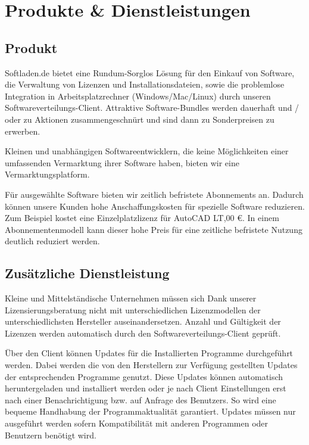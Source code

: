 \chapter{Produkte \& Dienstleistungen}
\section{Produkt}
Softladen.de bietet eine Rundum-Sorglos Lösung für den Einkauf von Software, die Verwaltung von Lizenzen und Installationsdateien, sowie die problemlose Integration in Arbeitsplatzrechner (Windows/Mac/Linux) durch unseren Softwareverteilungs-Client. Attraktive Software-Bundles werden dauerhaft und / oder zu Aktionen zusammengeschnürt und sind dann zu Sonderpreisen zu erwerben.\\ \medskip 

Kleinen und unabhängigen Softwareentwicklern, die keine Möglichkeiten einer umfassenden Vermarktung ihrer Software haben, bieten wir eine Vermarktungsplatform.\\ \medskip

Für ausgewählte Software bieten wir zeitlich befristete Abonnements an. Dadurch können unsere Kunden hohe Anschaffungskosten für spezielle Software reduzieren. Zum Beispiel kostet eine Einzelplatzlizenz für AutoCAD LT,00 €. In einem Abonnementenmodell kann dieser hohe Preis für eine zeitliche befristete Nutzung deutlich reduziert werden.  \\ \medskip

\section{Zusätzliche Dienstleistung}
Kleine und Mittelständische Unternehmen müssen sich Dank unserer Lizensierungsberatung nicht mit unterschiedlichen Lizenzmodellen der unterschiedlichsten Hersteller auseinandersetzen. Anzahl und Gültigkeit der Lizenzen werden automatisch durch den Softwareverteilungs-Client geprüft.\\ \medskip

Über den Client können Updates für die Installierten Programme durchgeführt werden. Dabei werden die von den Herstellern zur Verfügung gestellten Updates der entsprechenden Programme genutzt. Diese Updates können automatisch heruntergeladen und installiert werden oder je nach Client Einstellungen erst nach einer Benachrichtigung  bzw. auf Anfrage des Benutzers. So wird eine bequeme Handhabung der Programmaktualität garantiert. Updates müssen nur ausgeführt werden sofern Kompatibilität mit anderen Programmen oder Benutzern benötigt wird. \\ \medskip

